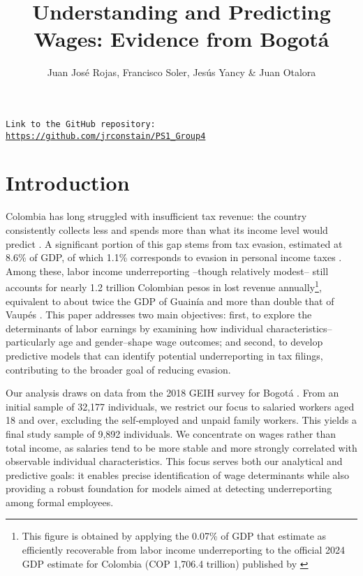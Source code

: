 \documentclass[12pt,a4paper,onecolumn]{article}
\title{\textbf{Understanding and Predicting Wages: Evidence from Bogot\'a}}
\author{Juan Jos\'e Rojas, Francisco Soler, Jes\'us Yancy \& Juan Otalora}
\date{}
\begin{document}
\maketitle
\thispagestyle{empty}

\begin{center}
\texttt{Link to the GitHub repository: \url{https://github.com/jrconstain/PS1_Group4}}
\end{center}

\section{Introduction}


Colombia has long struggled with insufficient tax revenue: the country consistently collects less and spends more than what its income level would predict \citep{Fergusson2022}. A significant portion of this gap stems from tax evasion, estimated at 8.6\% of GDP, of which 1.1\% corresponds to evasion in personal income taxes \citep{Lora2021a, Lora2021b}. Among these, labor income underreporting --though relatively modest-- still accounts for nearly 1.2 trillion Colombian pesos in lost revenue annually\footnote{This figure is obtained by applying the 0.07\% of GDP that \citet{Lora2021a} estimate as efficiently recoverable from labor income underreporting to the official 2024 GDP estimate for Colombia (COP 1,706.4 trillion) published by \citep{DANE2025a}}, equivalent to about twice the GDP of Guain\'ia and more than double that of Vaup\'es \citep{DANE2025a}. This paper addresses two main objectives: first, to explore the determinants of labor earnings by examining how individual characteristics--particularly age and gender--shape wage outcomes; and second, to develop predictive models that can identify potential underreporting in tax filings, contributing to the broader goal of reducing evasion.

Our analysis draws on data from the 2018 GEIH survey for Bogot\'a \citep{DANE2025b}. From an initial sample of 32,177 individuals, we restrict our focus to salaried workers aged 18 and over, excluding the self-employed and unpaid family workers. This yields a final study sample of 9,892 individuals. We concentrate on wages rather than total income, as salaries tend to be more stable and more strongly correlated with observable individual characteristics. This focus serves both our analytical and predictive goals: it enables precise identification of wage determinants while also providing a robust foundation for models aimed at detecting underreporting among formal employees.
\end{document}
